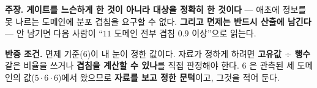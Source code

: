\documentclass[10pt,a4paper]{article}
\newcommand{\claim}[2]{\begin{claimbox}\textbf{주장.} #1\par\smallskip
  \textcolor{gray!70}{\textbf{반증 조건.} #2}\end{claimbox}}
\begin{document}
\claim{\textbf{게이트를 느슨하게 한 것이 아니라 대상을 정확히 한 것이다} --- 애초에
정보를 못 나르는 도메인에 분포 겹침을 요구할 수 없다. \textbf{그리고 면제는 반드시
산출에 남긴다} --- 안 남기면 다음 사람이 ``$11$ 도메인 전부 겹침 $0.9$ 이상''으로
읽는다.}
{면제 기준($6$)이 내 눈이 정한 값이다. 자료가 정하게 하려면 \textbf{고유값 $\div$
행수} 같은 비율을 쓰거나 \textbf{겹침을 계산할 수 있나}를 직접 판정해야 한다.
$6$ 은 관측된 세 도메인의 값($5 \cdot 6 \cdot 6$)에서 왔으므로 \textbf{자료를 보고
정한 문턱}이고, 그것을 적어 둔다.}
\end{document}

